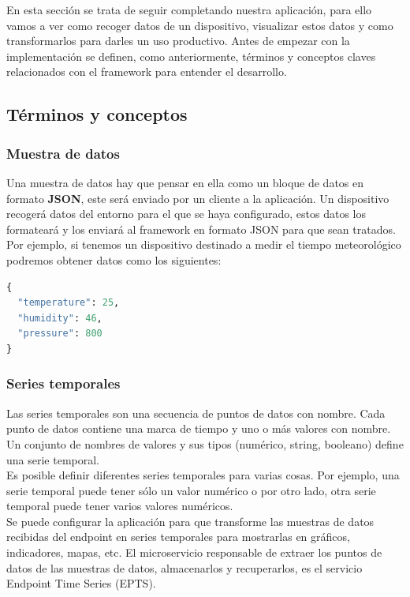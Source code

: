 {En esta sección se trata de seguir completando nuestra aplicación, para ello vamos a ver como recoger datos de un dispositivo, visualizar estos datos y como transformarlos para darles un uso productivo. Antes de empezar con la implementación se definen, como anteriormente, términos y conceptos claves relacionados con el framework para entender el desarrollo. \cite{kaaiotCollectData}

\subsection{Términos y conceptos}

\subsubsection{Muestra de datos}

Una muestra de datos hay que pensar en ella como un bloque de datos en formato \textbf{JSON}, este será enviado por un cliente a la aplicación. Un dispositivo recogerá datos del entorno para el que se haya configurado, estos datos los formateará y los enviará al framework en formato JSON para que sean tratados. Por ejemplo, si tenemos un dispositivo destinado a medir el tiempo meteorológico podremos obtener datos como los siguientes:

\begin{lstlisting}[language=Python]
{
  "temperature": 25,
  "humidity": 46,
  "pressure": 800
}
\end{lstlisting}

\subsubsection{Series temporales}

Las series temporales son una secuencia de puntos de datos con nombre. Cada punto de datos contiene una marca de tiempo y uno o más valores con nombre. Un conjunto de nombres de valores y sus tipos (numérico, string, booleano) define una serie temporal. \\

Es posible definir diferentes series temporales para varias cosas. Por ejemplo, una serie temporal puede tener sólo un valor numérico o por otro lado, otra serie temporal puede tener varios valores numéricos. \\

Se puede configurar la aplicación para que transforme las muestras de datos recibidas del endpoint en series temporales para mostrarlas en gráficos, indicadores, mapas, etc. El microservicio responsable de extraer los puntos de datos de las muestras de datos, almacenarlos y recuperarlos, es el servicio Endpoint Time Series (EPTS). \\

}
